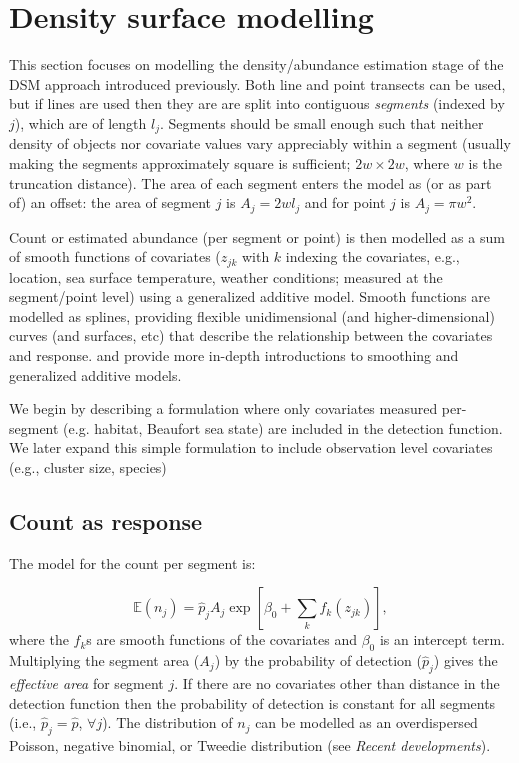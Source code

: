 \documentclass[a4paper,12pt]{article}
\begin{document}
\section*{Density surface modelling}
\label{s:dsm}

This section focuses on modelling the density/abundance estimation stage of the DSM approach introduced previously. Both line and point transects can be used, but if lines are used then they are are split into contiguous \textit{segments} (indexed by $j$), which are of length $l_j$. Segments should be small enough such that neither density of objects nor covariate values vary appreciably within a segment (usually making the segments approximately square is sufficient; $2w\times 2w$, where $w$ is the truncation distance). The area of each segment enters the model as (or as part of) an offset: the area of segment $j$ is $A_j = 2wl_j$ and for point $j$ is $A_j=\pi w^2$. 

Count or estimated abundance (per  segment or point) is then modelled as a sum of smooth functions of covariates ($z_{jk}$ with $k$ indexing the covariates, e.g., location, sea surface temperature, weather conditions; measured at the segment/point level) using a generalized additive model. Smooth functions are modelled as splines, providing flexible unidimensional (and higher-dimensional) curves (and surfaces, etc) that describe the relationship between the covariates and response. \cite{Wood:2006wz} and \cite{ruppert2003semiparametric} provide more in-depth introductions to smoothing and generalized additive models.

We begin by describing a formulation where only covariates measured per-segment (e.g. habitat, Beaufort sea state) are included in the detection function. We later expand this simple formulation to include observation level covariates (e.g., cluster size, species)

\subsection*{Count as response}

The model for the count per segment is:

\begin{equation*}
\mathbb{E}(n_j) = \hat{p}_j A_j \exp\left[ \beta_0 + \sum_k f_k\left(z_{jk}\right) \right],
\end{equation*}
where the $f_k$s are smooth functions of the covariates and $\beta_0$ is an intercept term. Multiplying the segment area ($A_j$) by the probability of detection ($\hat{p}_j$) gives the \textit{effective area} for segment $j$. If there are no covariates other than distance in the detection function then the probability of detection is constant for all segments (i.e., $\hat{p}_j=\hat{p}$, $\forall j$). The distribution of $n_j$ can be modelled as an overdispersed Poisson, negative binomial, or Tweedie distribution (see \textit{Recent developments}).
\end{document}

